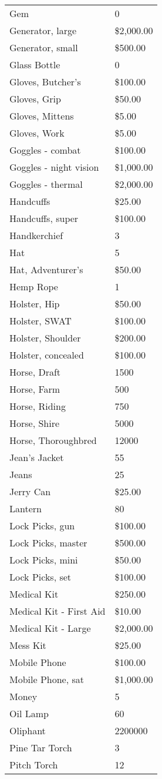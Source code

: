 \documentclass[twoside]{book}
\begin{document}
\begin{longtable}{p{1.25in}l}
      \raggedright Gem & 0 \tabularnewline
      \raggedright Generator, large & \$2,000.00 \tabularnewline
      \raggedright Generator, small & \$500.00 \tabularnewline
      \raggedright Glass Bottle & 0 \tabularnewline
      \raggedright Gloves, Butcher's & \$100.00 \tabularnewline
      \raggedright Gloves, Grip & \$50.00 \tabularnewline
      \raggedright Gloves, Mittens & \$5.00 \tabularnewline
      \raggedright Gloves, Work & \$5.00 \tabularnewline
      \raggedright Goggles - combat & \$100.00 \tabularnewline
      \raggedright Goggles - night vision & \$1,000.00 \tabularnewline
      \raggedright Goggles - thermal & \$2,000.00 \tabularnewline
      \raggedright Handcuffs & \$25.00 \tabularnewline
      \raggedright Handcuffs, super & \$100.00 \tabularnewline
      \raggedright Handkerchief & 3 \tabularnewline
      \raggedright Hat & 5 \tabularnewline
      \raggedright Hat, Adventurer's & \$50.00 \tabularnewline
      \raggedright Hemp Rope & 1 \tabularnewline
      \raggedright Holster, Hip & \$50.00 \tabularnewline
      \raggedright Holster, SWAT & \$100.00 \tabularnewline
      \raggedright Holster, Shoulder & \$200.00 \tabularnewline
      \raggedright Holster, concealed & \$100.00 \tabularnewline
      \raggedright Horse, Draft & 1500 \tabularnewline
      \raggedright Horse, Farm & 500 \tabularnewline
      \raggedright Horse, Riding & 750 \tabularnewline
      \raggedright Horse, Shire & 5000 \tabularnewline
      \raggedright Horse, Thoroughbred & 12000 \tabularnewline
      \raggedright Jean's Jacket & 55 \tabularnewline
      \raggedright Jeans & 25 \tabularnewline
      \raggedright Jerry Can & \$25.00 \tabularnewline
      \raggedright Lantern & 80 \tabularnewline
      \raggedright Lock Picks, gun & \$100.00 \tabularnewline
      \raggedright Lock Picks, master & \$500.00 \tabularnewline
      \raggedright Lock Picks, mini & \$50.00 \tabularnewline
      \raggedright Lock Picks, set & \$100.00 \tabularnewline
      \raggedright Medical Kit & \$250.00 \tabularnewline
      \raggedright Medical Kit - First Aid
           & \$10.00 \tabularnewline
      \raggedright Medical Kit - Large & \$2,000.00 \tabularnewline
      \raggedright Mess Kit & \$25.00 \tabularnewline
      \raggedright Mobile Phone & \$100.00 \tabularnewline
      \raggedright Mobile Phone, sat & \$1,000.00 \tabularnewline
      \raggedright Money & 5 \tabularnewline
      \raggedright Oil Lamp & 60 \tabularnewline
      \raggedright Oliphant & 2200000 \tabularnewline
      \raggedright Pine Tar Torch & 3 \tabularnewline
      \raggedright Pitch Torch & 12 \tabularnewline

\end{longtable}
\end{document}
